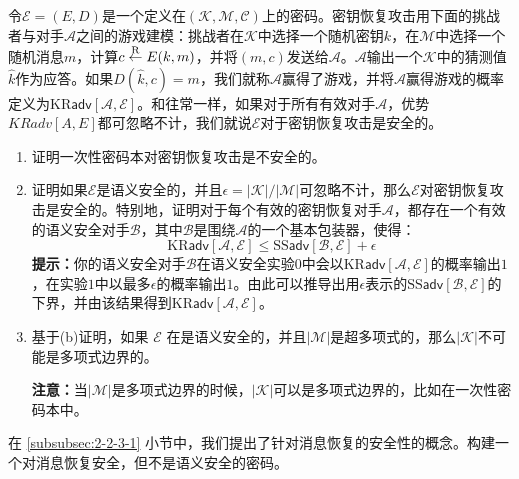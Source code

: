 \begin{exercise}[密钥恢复攻击]
令$\mathcal{E}=(E,D)$是一个定义在$(\mathcal{K},\mathcal{M},\mathcal{C})$上的密码。密钥恢复攻击用下面的挑战者与对手$\mathcal{A}$之间的游戏建模：挑战者在$\mathcal{K}$中选择一个随机密钥$k$，在$\mathcal{M}$中选择一个随机消息$m$，计算$c\overset{\rm R}\leftarrow E(k,m)$，并将$(m,c)$发送给$\mathcal{A}$。$\mathcal{A}$输出一个$\mathcal{K}$中的猜测值$\hat k$作为应答。如果$D(\hat{k},c)=m$，我们就称$\mathcal{A}$赢得了游戏，并将$\mathcal{A}$赢得游戏的概率定义为$\mathrm{KR}\mathsf{adv}[\mathcal{A},\mathcal{E}]$。和往常一样，如果对于所有有效对手$\mathcal{A}$，优势$KRadv[A,E]$都可忽略不计，我们就说$\mathcal{E}$对于密钥恢复攻击是安全的。
\begin{enumerate}[\indent(a)]
	\item 证明一次性密码本对密钥恢复攻击是不安全的。
	\item 证明如果$\mathcal{E}$是语义安全的，并且$\epsilon=|\mathcal{K}|/|\mathcal{M}|$可忽略不计，那么$\mathcal{E}$对密钥恢复攻击是安全的。特别地，证明对于每个有效的密钥恢复对手$\mathcal{A}$，都存在一个有效的语义安全对手$\mathcal{B}$，其中$\mathcal{B}$是围绕$\mathcal{A}$的一个基本包装器，使得：
	$$\mathrm{KR}\mathsf{adv}[\mathcal{A},\mathcal{E}]\leq\mathrm{SS}\mathsf{adv}[\mathcal{B},\mathcal{E}]+\epsilon$$
	\textbf{提示：}你的语义安全对手$\mathcal{B}$在语义安全实验$0$中会以$\mathrm{KR}\mathsf{adv}[\mathcal{A},\mathcal{E}]$的概率输出$1$，在实验$1$中以最多$\epsilon$的概率输出$1$。由此可以推导出用$\epsilon$表示的$\mathrm{SS}\mathsf{adv}[\mathcal{B},\mathcal{E}]$的下界，并由该结果得到$\mathrm{KR}\mathsf{adv}[\mathcal{A},\mathcal{E}]$。
	\item 基于(b)证明，如果 $\mathcal{E}$ 在是语义安全的，并且$|\mathcal{M}|$是超多项式的，那么$|\mathcal{K}|$不可能是多项式边界的。

	\vspace{1pt}

	\textbf{注意：}当$|\mathcal{M}|$是多项式边界的时候，$|\mathcal{K}|$可以是多项式边界的，比如在一次性密码本中。
\end{enumerate}
\end{exercise}

\begin{exercise}[对消息恢复的安全性]
在 \ref{subsubsec:2-2-3-1} 小节中，我们提出了针对消息恢复的安全性的概念。构建一个对消息恢复安全，但不是语义安全的密码。
\end{exercise}

